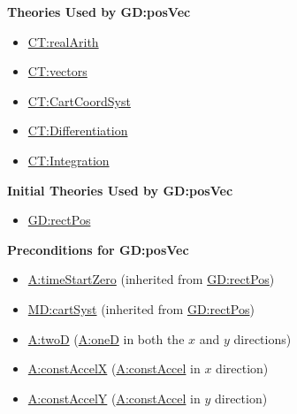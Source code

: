 \documentclass[12pt]{article}
\begin{document}
\noindent \textbf{Theories Used by GD:posVec}

\begin{itemize}
\item \hyperref[CT:realArith]{CT:realArith}
\item \hyperref[CT:vectors]{CT:vectors}
\item \hyperref[CT:CartCoordSyst]{CT:CartCoordSyst}
\item \hyperref[CT:Differentiation]{CT:Differentiation}
\item \hyperref[CT:Integration]{CT:Integration}
\end{itemize}

\noindent \textbf{Initial Theories Used by GD:posVec}

\begin{itemize}
\item \hyperref[GD:rectPos]{GD:rectPos}
\end{itemize}

\noindent \textbf{Preconditions for GD:posVec}
\begin{itemize}
\item \hyperref[timeStartZero]{A:timeStartZero} (inherited from \hyperref[GD:rectPos]{GD:rectPos})
\item \hyperref[MD:cartSyst]{MD:cartSyst} (inherited from
\hyperref[GD:rectPos]{GD:rectPos})
\item \hyperref[twoD]{A:twoD} (\hyperref[oneD]{A:oneD} in both the $x$ and $y$ directions)
\item \hyperref[constAccelX]{A:constAccelX} (\hyperref[constAccel]{A:constAccel}
in $x$ direction)
\item \hyperref[constAccelY]{A:constAccelY} (\hyperref[constAccel]{A:constAccel}
in $y$ direction)
\end{itemize}
\end{document}
